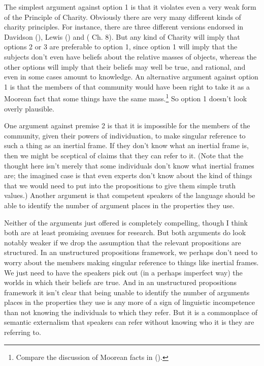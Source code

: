 \documentclass[
  10pt,
  letterpaper,
  DIV=11,
  numbers=noendperiod,
  twoside]{scrartcl}
\begin{document}
The simplest argument against option 1 is that it violates even a very
weak form of the Principle of Charity. Obviously there are very many
different kinds of charity principles. For instance, there are three
different versions endorsed in Davidson
(), Lewis
() and
( Ch. 8). But
any kind of Charity will imply that options 2 or 3 are preferable to
option 1, since option 1 will imply that the subjects don't even have
beliefs about the relative masses of objects, whereas the other options
will imply that their beliefs may well be true, and rational, and even
in some cases amount to knowledge. An alternative argument against
option 1 is that the members of that community would have been right to
take it as a Moorean fact that some things have the same
mass.\footnote{Compare the discussion of Moorean facts in
  ().} So option 1 doesn't
look overly plausible.

One argument against premise 2 is that it is impossible for the members
of the community, given their powers of individuation, to make singular
reference to such a thing as an inertial frame. If they don't know what
an inertial frame is, then we might be sceptical of claims that they can
refer to it. (Note that the thought here isn't merely that some
individuals don't know what inertial frames are; the imagined case is
that even experts don't know about the kind of things that we would need
to put into the propositions to give them simple truth values.) Another
argument is that competent speakers of the language should be able to
identify the number of argument places in the properties they use.

Neither of the arguments just offered is completely compelling, though I
think both are at least promising avenues for research. But both
arguments do look notably weaker if we drop the assumption that the
relevant propositions are structured. In an unstructured propositions
framework, we perhaps don't need to worry about the members making
singular reference to things like inertial frames. We just need to have
the speakers pick out (in a perhaps imperfect way) the worlds in which
their beliefs are true. And in an unstructured propositions framework it
isn't clear that being unable to identify the number of arguments places
in the properties they use is any more of a sign of linguistic
incompetence than not knowing the individuals to which they refer. But
it is a commonplace of semantic externalism that speakers can refer
without knowing who it is they are referring to.
\end{document}
